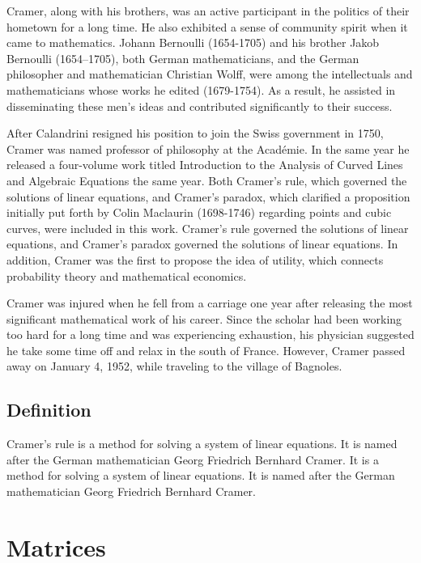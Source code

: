 \documentclass[titlepage,a4paper]{article}
\begin{document}
				Cramer, along with his brothers, was an active participant in the politics of their hometown for a long time.
				He also exhibited a sense of community spirit when it came to mathematics.
				Johann Bernoulli (1654-1705) and his brother Jakob Bernoulli (1654–1705), both German mathematicians, and the German philosopher and mathematician Christian Wolff, were among the intellectuals and mathematicians whose works he edited (1679-1754).
				As a result, he assisted in disseminating these men's ideas and contributed significantly to their success.
	   
				After Calandrini resigned his position to join the Swiss government in 1750, Cramer was named professor of philosophy at the Académie. 
				In the same year he released a four-volume work titled Introduction to the Analysis of Curved Lines and Algebraic Equations the same year.
				Both Cramer's rule, which governed the solutions of linear equations, and Cramer's paradox, which clarified a proposition initially put forth by Colin Maclaurin (1698-1746) regarding points and cubic curves, were included in this work.
				Cramer's rule governed the solutions of linear equations, and Cramer's paradox governed the solutions of linear equations.
				In addition, Cramer was the first to propose the idea of utility, which connects probability theory and mathematical economics.
	   
				Cramer was injured when he fell from a carriage one year after releasing the most significant mathematical work of his career.
				Since the scholar had been working too hard for a long time and was experiencing exhaustion, his physician suggested he take some time off and relax in the south of France.
				However, Cramer passed away on January 4, 1952, while traveling to the village of Bagnoles.
    	
			\subsection{Definition}
        	Cramer's rule is a method for solving a system of linear equations.
        	It is named after the German mathematician Georg Friedrich Bernhard Cramer.
        	It is a method for solving a system of linear equations.
        	It is named after the German mathematician Georg Friedrich Bernhard Cramer.
    	\newpage

	\section{Matrices}
\end{document}
